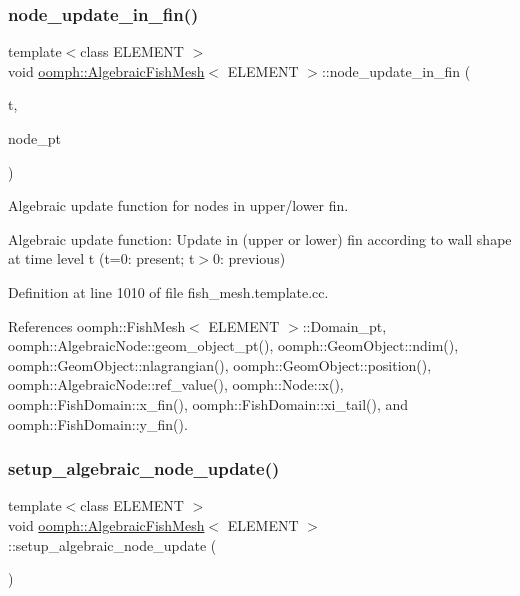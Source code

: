 \subsubsection{\texorpdfstring{node\+\_\+update\+\_\+in\+\_\+fin()}{node\_update\_in\_fin()}}
{\footnotesize\ttfamily template$<$class E\+L\+E\+M\+E\+NT $>$ \\
void \hyperlink{classoomph_1_1AlgebraicFishMesh}{oomph\+::\+Algebraic\+Fish\+Mesh}$<$ E\+L\+E\+M\+E\+NT $>$\+::node\+\_\+update\+\_\+in\+\_\+fin (\begin{DoxyParamCaption}\item[{const unsigned \&}]{t,  }\item[{\hyperlink{classoomph_1_1AlgebraicNode}{Algebraic\+Node} $\ast$\&}]{node\+\_\+pt }\end{DoxyParamCaption})\hspace{0.3cm}{\ttfamily [protected]}}



Algebraic update function for nodes in upper/lower fin. 

Algebraic update function\+: Update in (upper or lower) fin according to wall shape at time level t (t=0\+: present; t$>$0\+: previous) 

Definition at line 1010 of file fish\+\_\+mesh.\+template.\+cc.



References oomph\+::\+Fish\+Mesh$<$ E\+L\+E\+M\+E\+N\+T $>$\+::\+Domain\+\_\+pt, oomph\+::\+Algebraic\+Node\+::geom\+\_\+object\+\_\+pt(), oomph\+::\+Geom\+Object\+::ndim(), oomph\+::\+Geom\+Object\+::nlagrangian(), oomph\+::\+Geom\+Object\+::position(), oomph\+::\+Algebraic\+Node\+::ref\+\_\+value(), oomph\+::\+Node\+::x(), oomph\+::\+Fish\+Domain\+::x\+\_\+fin(), oomph\+::\+Fish\+Domain\+::xi\+\_\+tail(), and oomph\+::\+Fish\+Domain\+::y\+\_\+fin().

\mbox{\label{classoomph_1_1AlgebraicFishMesh_a1a6d22eedc77299d843274e8ce34b560}} 
\subsubsection{\texorpdfstring{setup\+\_\+algebraic\+\_\+node\+\_\+update()}{setup\_algebraic\_node\_update()}}
{\footnotesize\ttfamily template$<$class E\+L\+E\+M\+E\+NT $>$ \\
void \hyperlink{classoomph_1_1AlgebraicFishMesh}{oomph\+::\+Algebraic\+Fish\+Mesh}$<$ E\+L\+E\+M\+E\+NT $>$\+::setup\+\_\+algebraic\+\_\+node\+\_\+update (\begin{DoxyParamCaption}{ }\end{DoxyParamCaption})\hspace{0.3cm}{\ttfamily [protected]}}




